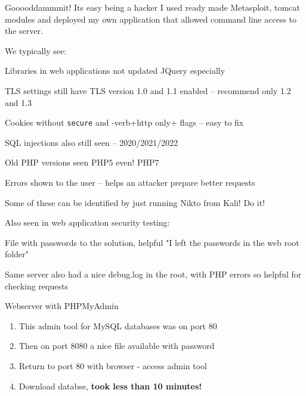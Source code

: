 \documentclass[Screen16to9,17pt]{foils}
\begin{document}
\begin{list2}
    \item Gooooddammmit! Its easy being a hacker I used ready made Metasploit, tomcat modules and deployed my own application that allowed command line access to the server.

\end{list2}




We typically see:
\begin{list2}
\item Libraries in web applications not updated JQuery especially
\item TLS settings still have TLS version 1.0 and 1.1 enabled -- recommend only 1.2 and 1.3
\item Cookies without \verb+secure+ and -verb+http only+ flags -- easy to fix
\item SQL injections also still seen -- 2020/2021/2022
\item Old PHP versions seen PHP5 even! PHP7
\item Errors shown to the user -- helps an attacker prepare better requests
\end{list2}

Some of these can be identified by just running Nikto from Kali! Do it!


Also seen in web application security testing:
\begin{list2}
\item File with passwords to the solution, helpful "I left the passwords in the web root folder"
\item Same server also had a nice debug.log in the root, with PHP errors so helpful for checking requests
\item Webserver with PHPMyAdmin
\begin{enumerate}
\item This admin tool for MySQL databases was on port 80
\item Then on port 8080 a nice file available with password
\item Return to port 80 with browser - access admin tool
\item Download databse, {\bf took less than 10 minutes!}
\end{enumerate}
\end{list2}


\end{document}
